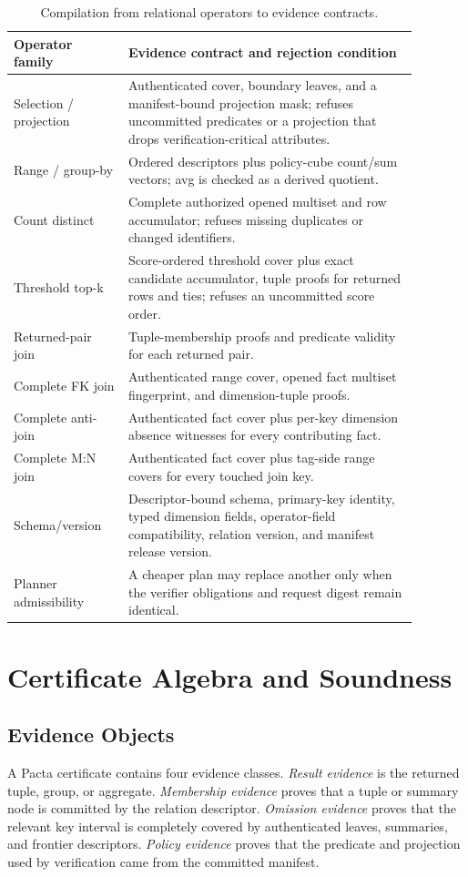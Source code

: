 \documentclass[conference]{IEEEtran}
\newcommand{\sys}{Pacta\xspace}
\begin{document}
\begin{table}[t]
\centering
\caption{Compilation from relational operators to evidence contracts.}
\label{tab:compile}
\scriptsize
\begin{tabular}{p{0.25\linewidth}p{0.63\linewidth}}
\toprule
Operator family & Evidence contract and rejection condition \\
\midrule
Selection / projection & Authenticated cover, boundary leaves, and a manifest-bound projection mask; refuses uncommitted predicates or a projection that drops verification-critical attributes. \\
Range / group-by & Ordered descriptors plus policy-cube count/sum vectors; avg is checked as a derived quotient. \\
Count distinct & Complete authorized opened multiset and row accumulator; refuses missing duplicates or changed identifiers. \\
Threshold top-k & Score-ordered threshold cover plus exact candidate accumulator, tuple proofs for returned rows and ties; refuses an uncommitted score order. \\
Returned-pair join & Tuple-membership proofs and predicate validity for each returned pair. \\
Complete FK join & Authenticated range cover, opened fact multiset fingerprint, and dimension-tuple proofs. \\
Complete anti-join & Authenticated fact cover plus per-key dimension absence witnesses for every contributing fact. \\
Complete M:N join & Authenticated fact cover plus tag-side range covers for every touched join key. \\
Schema/version & Descriptor-bound schema, primary-key identity, typed dimension fields, operator-field compatibility, relation version, and manifest release version. \\
Planner admissibility & A cheaper plan may replace another only when the verifier obligations and request digest remain identical. \\
\bottomrule
\end{tabular}
\end{table}

\section{Certificate Algebra and Soundness}
\subsection{Evidence Objects}
A \sys certificate contains four evidence classes. \emph{Result evidence} is the returned tuple, group, or aggregate. \emph{Membership evidence} proves that a tuple or summary node is committed by the relation descriptor. \emph{Omission evidence} proves that the relevant key interval is completely covered by authenticated leaves, summaries, and frontier descriptors. \emph{Policy evidence} proves that the predicate and projection used by verification came from the committed manifest.
\end{document}
